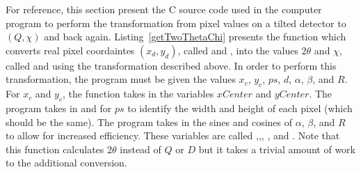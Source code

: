 For reference, this section present the C source 
code used in the computer program to perform the 
transformation from pixel values on a tilted 
detector to $(Q,\chi)$ and back again. 
Listing~\ref{getTwoThetaChi} presents the function
 which converts real pixel
coordaintes $(x_d,y_d)$, called 
and , into the values $2\theta$ and $\chi$, 
called  and  using the 
transformation described above. In order to perform 
this transformation, the program must be given
the values $x_c$, $y_c$, $ps$, $d$, 
$\alpha$, $\beta$, and $R$. For $x_c$ and $y_c$, 
the function takes in the variables $xCenter$ and
$yCenter$. The program takes in  
and  for $ps$ to identify the
width and height of each pixel (which should be the 
same). The program takes in the sines and cosines
of $\alpha$, $\beta$, and $R$ to allow for increased
efficiency. These variables are called 
,,,
, and . 
Note that this function calculates $2\theta$ instead
of $Q$ or $D$ but it takes a trivial amount of work
to the additional conversion.
